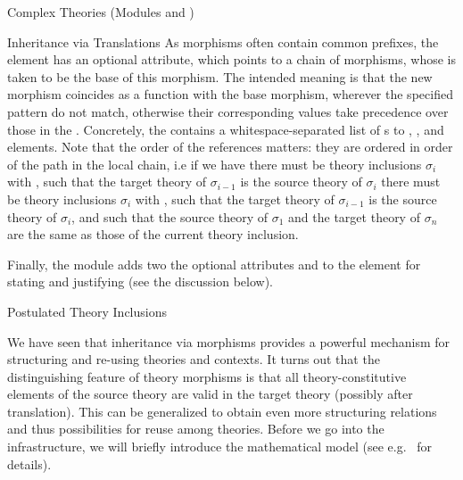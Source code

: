 \begin{tchapter}[id=complex-theories,short=Complex Theories]{Complex Theories (Modules
    {} and {})}
\begin{tsection}[id=morphisms]{Inheritance via Translations}
As morphisms often contain common prefixes, the {} element has an
optional {} attribute, which points to a chain of
morphisms, whose {} is taken to be the base of
this morphism. The intended meaning is that the new morphism coincides as a function with
the base morphism, wherever the specified pattern do not match, otherwise their
corresponding values take precedence over those in the {}.
Concretely, the {} contains a whitespace-separated list of
{s} to {}, {},
and {} elements. Note that the order of the references matters: they are
ordered in order of the path in the local chain, i.e if we have
  {{} there must be theory
    inclusions $\sigma_i$ with {}, such that
    the target theory of $\sigma_{i-1}$ is the source theory of $\sigma_i$}
  {{} there must be theory
  inclusions $\sigma_i$ with {}, such that the
  target theory of $\sigma_{i-1}$ is the source theory of $\sigma_i$, and such that the
  source theory of $\sigma_1$ and the target theory of $\sigma_n$ are the same as those of
  the current theory inclusion}. 

Finally, the {} module adds two the optional attributes
{} and {} to
the {} element for stating and justifying {}
(see the discussion below).
\end{tsection}

\begin{tsection}[id=theory-inclusions]{Postulated Theory Inclusions}
  
  We have seen that inheritance via morphisms provides a powerful mechanism for
  structuring and re-using theories and contexts. It turns out that the distinguishing
  feature of theory morphisms is that all theory-constitutive elements of the source
  theory are valid in the target theory (possibly after translation). This can be
  generalized to obtain even more structuring relations and thus possibilities for reuse
  among theories. Before we go into the {\omdoc} infrastructure, we will briefly introduce
  the mathematical model (see e.g.~\cite{Hutter:mocsv00} for details).


\end{tsection}
\end{tchapter}
